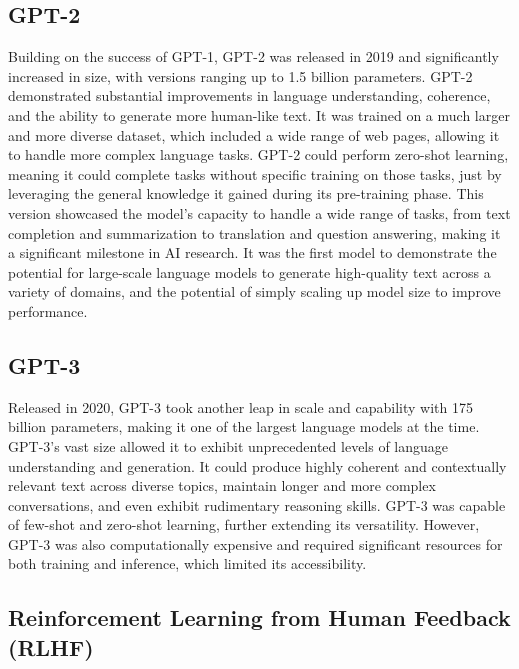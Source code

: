 \documentclass[a4paper,12pt,twoside]{ThesisStyle}
\begin{document}
\subsection{GPT-2}
\label{subsec:gpt-2}

Building on the success of GPT-1, GPT-2 \cite{Radford2019GPT2} was released in 2019 and significantly increased in size, with versions ranging up to 1.5 billion parameters. GPT-2 demonstrated substantial improvements in language understanding, coherence, and the ability to generate more human-like text. It was trained on a much larger and more diverse dataset, which included a wide range of web pages, allowing it to handle more complex language tasks. GPT-2 could perform zero-shot learning, meaning it could complete tasks without specific training on those tasks, just by leveraging the general knowledge it gained during its pre-training phase. This version showcased the model's capacity to handle a wide range of tasks, from text completion and summarization to translation and question answering, making it a significant milestone in AI research. It was the first model to demonstrate the potential for large-scale language models to generate high-quality text across a variety of domains, and the potential of simply scaling up model size to improve performance.

\subsection{GPT-3}
\label{subsec:gpt-3}

Released in 2020, GPT-3 \cite{Brown2020GPT3} took another leap in scale and capability with 175 billion parameters, making it one of the largest language models at the time. GPT-3's vast size allowed it to exhibit unprecedented levels of language understanding and generation. It could produce highly coherent and contextually relevant text across diverse topics, maintain longer and more complex conversations, and even exhibit rudimentary reasoning skills. GPT-3 was capable of few-shot and zero-shot learning, further extending its versatility. However, GPT-3 was also computationally expensive and required significant resources for both training and inference, which limited its accessibility.

\subsection{Reinforcement Learning from Human Feedback (RLHF)}
\label{subsec:rlhf}
\end{document}

